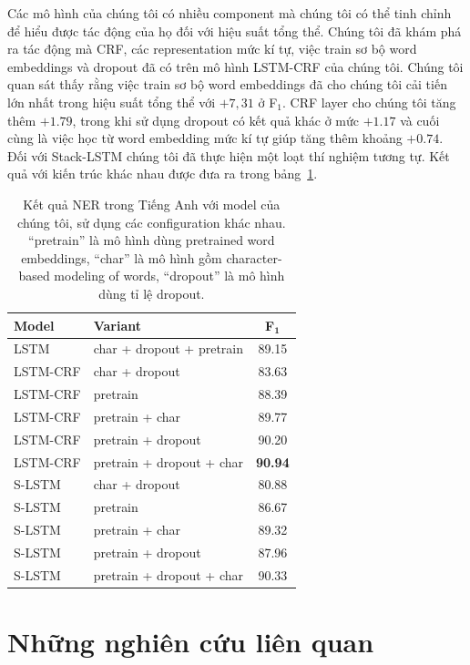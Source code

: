 \documentclass[11pt,letterpaper]{article}
\begin{document}
Các mô hình của chúng tôi có nhiều component mà chúng tôi có thể tinh chỉnh để hiểu được tác động của họ đối với hiệu suất tổng thể. Chúng tôi đã khám phá ra tác động mà CRF, các representation mức kí tự, việc train sơ bộ word embeddings và dropout đã có trên mô hình LSTM-CRF của chúng tôi. Chúng tôi quan sát thấy rằng việc train sơ bộ word embeddings đã cho chúng tôi cải tiến lớn nhất trong hiệu suất tổng thể với $+7,31$ ở F$_1$. CRF layer cho chúng tôi tăng thêm $+1.79$, trong khi sử dụng dropout có kết quả khác ở mức $+1.17$ và cuối cùng là việc học từ word embedding mức kí tự giúp tăng thêm  khoảng $+0.74$. Đối với Stack-LSTM chúng tôi đã thực hiện một loạt thí nghiệm tương tự. Kết quả với kiến trúc khác nhau được đưa ra trong bảng~\ref{results-diff-config}.

\begin{table}[h]
\centering
\begin{scriptsize}
\begin{tabular}{l|l|c}
\textbf{Model} & \textbf{Variant} & \textbf{F}${_{\mathbf{1}}}$\\
\hline
LSTM & char + dropout + pretrain & 89.15 \\
LSTM-CRF & char + dropout & 83.63 \\
LSTM-CRF & pretrain & 88.39 \\
LSTM-CRF & pretrain + char & 89.77 \\
LSTM-CRF & pretrain + dropout & 90.20 \\
LSTM-CRF & pretrain + dropout + char & \bf90.94 \\
\hline
S-LSTM & char + dropout & 80.88 \\
S-LSTM & pretrain & 86.67 \\
S-LSTM & pretrain + char & 89.32 \\
S-LSTM & pretrain + dropout & 87.96 \\
S-LSTM & pretrain + dropout + char & 90.33 \\
\end{tabular}
\end{scriptsize}
\caption{Kết quả NER trong Tiếng Anh với model của chúng tôi, sử dụng các configuration khác nhau. ``pretrain'' là mô hình dùng pretrained word embeddings, ``char'' là mô hình gồm character-based modeling of words, ``dropout'' là mô hình dùng tỉ lệ dropout.}
\label{results-diff-config}
\end{table}%

\section{Những nghiên cứu liên quan}
\label{relwork}
\end{document}
